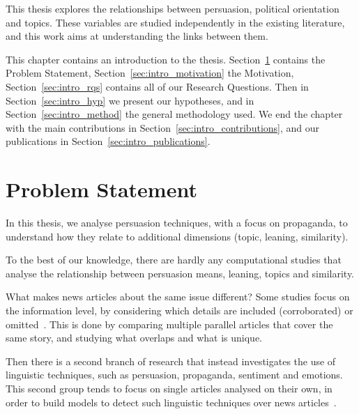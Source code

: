 This thesis explores the relationships between persuasion, political orientation and topics.
These variables are studied independently in the existing literature, and this work aims at understanding the links between them.









This chapter contains an introduction to the thesis.
Section~\ref{sec:intro_problem} contains the Problem Statement, Section~\ref{sec:intro_motivation} the Motivation, Section~\ref{sec:intro_rqs} contains all of our Research Questions. Then in Section~\ref{sec:intro_hyp} we present our hypotheses, and in Section~\ref{sec:intro_method} the general methodology used. We end the chapter with the main contributions in Section~\ref{sec:intro_contributions}, %
and our publications in Section~\ref{sec:intro_publications}.


\section{\statusgreen Problem Statement}
\label{sec:intro_problem}



In this thesis, we analyse persuasion techniques, with a focus on propaganda, to understand how they relate to additional dimensions (topic, leaning, similarity).

To the best of our knowledge, there are hardly any computational studies that analyse the relationship between persuasion means, leaning, topics and similarity.

What makes news articles about the same issue different?
Some studies focus on the information level, by considering which details are included (corroborated) or omitted~\citep{bountouridis2018explaining}.
This is done by comparing multiple parallel articles that cover the same story, and studying what overlaps and what is unique.

Then there is a second branch of research that instead investigates the use of linguistic techniques, such as persuasion, propaganda, sentiment and emotions. This second group tends to focus on single articles analysed on their own, in order to build models to detect such linguistic techniques over news articles~\citep{da2019fine}. %

